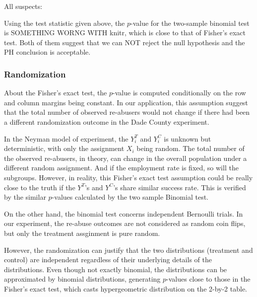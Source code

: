 \documentclass{article}
\newcommand{\rinline}[1]{SOMETHING WORNG WITH knitr}
\begin{document}
All suspects:


Using the test statistic given above, the $p$-value for the two-sample
binomial test is \rinline{pnorm(two.binom.test(cl3)) / 2}, which is
close to that of Fisher's exact test. Both of them suggest that we can
NOT reject the null hypothesis and the PH conclusion is acceptable.


\newpage
\subsubsection*{Randomization}
\hspace{12 pt} About the Fisher's exact test, the $p$-value is
computed conditionally on the row and column margins being
constant. In our application, this assumption suggest that the total
number of observed re-abusers would not change if there had been a
different randomization outcome in the Dade County experiment. 

In the Neyman model of experiment, the $Y_i^T$ and $Y_i^C$ is
unknown but deterministic, with only the assignment $X_i$ being
random. The total number of the observed re-abusers, in theory, can
change in the overall population under a different random
assignment. And if the employment rate is fixed, so will the
subgroups. 
However, in reality, this Fisher's exact test assumption could
be really close to the truth if the $Y^T$'s and $Y^C$'s share similar
success rate. This is verified by the similar $p$-values calculated by
the two sample Binomial test.


On the other hand, the binomial test
concerns independent Bernoulli trials. In our experiment, the re-abuse
outcomes are not considered as random coin flips, but only the
treatment assginment is pure random. 

However, the randomization can justify that the two distributions
(treatment and control) are independent regardless of their underlying
details of the distributions. Even though not exactly binomial, the
distributions can be approximated by binomial distributions, generating
$p$-values close to those in the Fisher's exact test, which casts
hypergeometric distribution on the 2-by-2 table.
\end{document}
